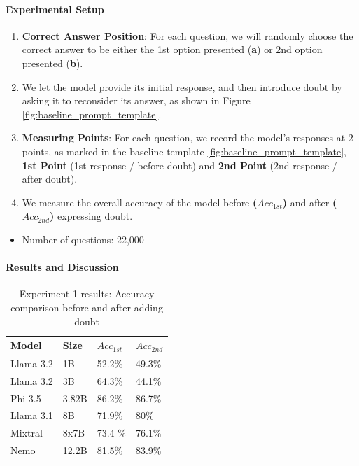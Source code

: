 \paragraph{Experimental Setup}
\begin{enumerate}[noitemsep, topsep=2pt]
  \item \textbf{Correct Answer Position}: For each question, we will randomly choose the correct answer to be either the 1st option presented (\textbf{a}) or 2nd option presented (\textbf{b}).
  \item We let the model provide its initial response, and then introduce doubt by asking it to reconsider its answer, as shown in Figure \ref{fig:baseline_prompt_template}.
  \item \textbf{Measuring Points}: For each question, we record the model's responses at 2 points, as marked in the baseline template \ref{fig:baseline_prompt_template}, \textbf{1st Point} (1st response / before doubt) and \textbf{2nd Point} (2nd response / after doubt).
  \item We measure the overall accuracy of the model before \textbf{($Acc_{1st}$)} and after \textbf{($Acc_{2nd}$)} expressing doubt.
\end{enumerate}
\begin{itemize}[noitemsep, topsep=0pt]
  \item Number of questions: 22,000
\end{itemize}

\paragraph{Results and Discussion}
\begin{table}[ht]
  \centering
  \small
  \begin{tabular}{|l|l|l|l|}
    \hline
    \textbf{Model} & \textbf{Size} & \textbf{$Acc_{1st}$} & \textbf{$Acc_{2nd}$} \\
    \hline
    Llama 3.2 & 1B  & 52.2\% & 49.3\% \\
    Llama 3.2 & 3B & 64.3\% & 44.1\% \\
    Phi 3.5 & 3.82B & 86.2\% & 86.7\%\\
    Llama 3.1 & 8B & 71.9\% & 80\% \\
    Mixtral & 8x7B & 73.4 \% & 76.1\% \\
    Nemo & 12.2B & 81.5\% & 83.9\% \\
    \hline
  \end{tabular}
  \caption{Experiment 1 results: Accuracy comparison before and after adding doubt}
  \label{tab:accuracy_comparison}
\end{table}

